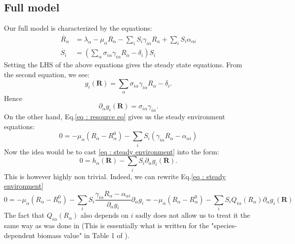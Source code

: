 \documentclass[12pt]{article}
\newcommand{\vect}[1]{\textbf{#1}}
\begin{document}
\begin{appendices}
		\subsection{Full model}
		Our full model is characterized by the equations:
		\begin{align}
			\dot{R_\alpha} &= \lambda_\alpha-\mu_\alpha R_\alpha - \sum_i S_i \gamma_{i\alpha} R_\alpha + \sum_i S_i \alpha_{\alpha i} \label{eq : resource eq}\\
			\dot{S_i} & = \left( \sum_\alpha \sigma_{i\alpha} \gamma_{i\alpha} R_\alpha -\delta_i \right) S_i
		\end{align}
		Setting the LHS of the above equations gives the steady state equations. From the second equation, we see:
		\begin{equation}
			g_i(\vect{R}) = \sum_{\alpha} \sigma_{i\alpha} \gamma_{i\alpha} R_\alpha - \delta_i.
		\end{equation}
		Hence
		\begin{equation}
			\partial_\alpha g_i(\vect{R}) = \sigma_{i\alpha} \gamma_{i\alpha}.
		\end{equation}
		On the other hand, Eq.\eqref{eq : resource eq} gives us the steady environment equations:
		\begin{equation}
			0 = -\mu_\alpha (R_\alpha - R_\alpha^0)- \sum_i S_i (\gamma_{i\alpha}R_\alpha-\alpha_{\alpha i}) \label{eq : steady environment}
		\end{equation}
		Now the idea would be to cast \eqref{eq : steady environment} into the form:
		\begin{equation}
			0 = h_\alpha(\vect{R})- \sum_i S_i \partial_\alpha g_i(\vect{R}).
		\end{equation}
		This is however highly non trivial. Indeed, we can rewrite Eq.\eqref{eq : steady environment}
		\begin{equation}
			0 = -\mu_\alpha (R_\alpha - R_\alpha^0)-\sum_i S_i \frac{\gamma_{i\alpha}R_\alpha-\alpha_{\alpha i}}{\partial_\alpha g_i} \partial_\alpha g_i = - \mu_\alpha(R_\alpha- R_\alpha^0) - \sum_i S_i Q_{i \alpha}(R_\alpha)\partial_\alpha g_i (\vect{R})
		\end{equation}
		The fact that $Q_{i\alpha}(R_\alpha)$ also depends on $i$ sadly does not allow us to treat it the same way as was done in \cite{PankajNiche} (This is essentially what is written for the "species-dependent biomass value" in Table 1 of \cite{PankajNiche}).


\end{appendices}
\end{document}
